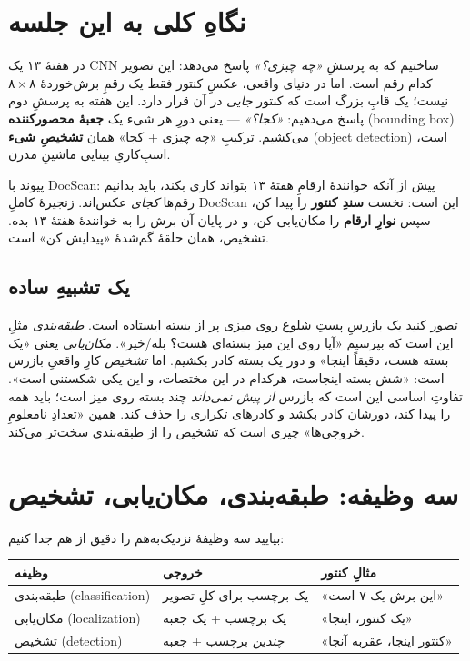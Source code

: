 \documentclass[12pt,a4paper]{article}
\begin{document}

\tableofcontents
\vspace{6pt}

\section*{نگاهِ کلی به این جلسه}

در هفتهٔ ۱۳ یک CNN ساختیم که به پرسشِ \emph{«چه چیزی؟»} پاسخ می‌دهد: این تصویر کدام رقم است. اما در دنیای واقعی، عکسِ کنتور فقط یک رقمِ برش‌خوردهٔ $۸\times۸$ نیست؛ یک قابِ بزرگ است که کنتور \emph{جایی} در آن قرار دارد. این هفته به پرسشِ دوم پاسخ می‌دهیم: \emph{«کجا؟»} — یعنی دورِ هر شیء یک \textbf{جعبهٔ محصورکننده} (bounding box) می‌کشیم. ترکیبِ «چه چیزی + کجا» همان \textbf{تشخیصِ شیء} (object detection) است، اسبِ‌کاریِ بینایی ماشینِ مدرن.

\begin{yaddasht}
پیوند با DocScan: پیش از آنکه خوانندهٔ ارقامِ هفتهٔ ۱۳ بتواند کاری بکند، باید بدانیم رقم‌ها \emph{کجای} عکس‌اند. زنجیرهٔ کاملِ DocScan این است: نخست \textbf{سندِ کنتور} را پیدا کن، سپس \textbf{نوارِ ارقام} را مکان‌یابی کن، و در پایان آن برش را به خوانندهٔ هفتهٔ ۱۳ بده. تشخیص، همان حلقهٔ گم‌شدهٔ «پیدایش کن» است.
\end{yaddasht}

\subsection*{یک تشبیهِ ساده}

تصور کنید یک بازرسِ پستِ شلوغ روی میزی پر از بسته ایستاده است. \emph{طبقه‌بندی} مثلِ این است که بپرسیم «آیا روی این میز بسته‌ای هست؟ بله/خیر». \emph{مکان‌یابی} یعنی «یک بسته هست، دقیقاً اینجا» و دور یک بسته کادر بکشیم. اما \emph{تشخیص} کارِ واقعیِ بازرس است: «شش بسته اینجاست، هرکدام در این مختصات، و این یکی شکستنی است». تفاوتِ اساسی این است که بازرس \emph{از پیش نمی‌داند} چند بسته روی میز است؛ باید همه را پیدا کند، دورشان کادر بکشد و کادرهای تکراری را حذف کند. همین «تعدادِ نامعلومِ خروجی‌ها» چیزی است که تشخیص را از طبقه‌بندی سخت‌تر می‌کند.

\section{سه وظیفه: طبقه‌بندی، مکان‌یابی، تشخیص}

بیایید سه وظیفهٔ نزدیک‌به‌هم را دقیق از هم جدا کنیم:

\begin{center}
\begin{tabular}{@{}lll@{}}
\hline
\textbf{وظیفه} & \textbf{خروجی} & \textbf{مثالِ کنتور} \\
\hline
طبقه‌بندی (classification) & یک برچسب برای کلِ تصویر & «این برش یک ۷ است» \\
مکان‌یابی (localization) & یک برچسب + یک جعبه & «یک کنتور، اینجا» \\
تشخیص (detection) & \emph{چندین} برچسب + جعبه & «کنتور اینجا، عقربه آنجا» \\
\hline
\end{tabular}
\end{center}
\end{document}
